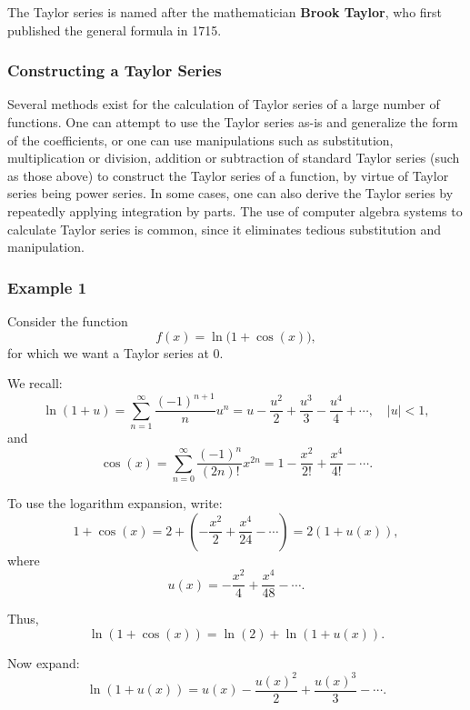 The Taylor series is named after the mathematician \textbf{Brook Taylor}, who first published the general formula in 1715.

\subsubsection{Constructing a Taylor Series}
\label{sss:cons-9461}


Several methods exist for the calculation of Taylor series of a large number of functions. One can attempt to use the Taylor series as-is and generalize the form of the coefficients, or one can use manipulations such as substitution, multiplication or division, addition or subtraction of standard Taylor series (such as those above) to construct the Taylor series of a function, by virtue of Taylor series being power series. In some cases, one can also derive the Taylor series by repeatedly applying integration by parts. The use of computer algebra systems to calculate Taylor series is common, since it eliminates tedious substitution and manipulation.


\subsubsection{Example 1}
\label{sss:exam-acc3}

Consider the function
\[
f(x) = \ln\big(1+\cos(x)\big),
\]
for which we want a Taylor series at $0$.

\medskip

We recall:
\[
\ln(1+u) = \sum_{n=1}^{\infty} \frac{(-1)^{n+1}}{n} u^n
= u - \frac{u^2}{2} + \frac{u^3}{3} - \frac{u^4}{4} + \cdots,
\quad |u|<1,
\]
and
\[
\cos(x) = \sum_{n=0}^{\infty} \frac{(-1)^n}{(2n)!} x^{2n}
= 1 - \frac{x^2}{2!} + \frac{x^4}{4!} - \cdots.
\]

\medskip

To use the logarithm expansion, write:
\[
1+\cos(x) = 2 + \left(-\frac{x^2}{2} + \frac{x^4}{24} - \cdots\right)
= 2\left(1 + u(x)\right),
\]
where
\[
u(x) = -\frac{x^2}{4} + \frac{x^4}{48} - \cdots.
\]

Thus,
\[
\ln(1+\cos(x)) = \ln(2) + \ln(1+u(x)).
\]

Now expand:
\[
\ln(1+u(x)) = u(x) - \frac{u(x)^2}{2} + \frac{u(x)^3}{3} - \cdots.
\]

